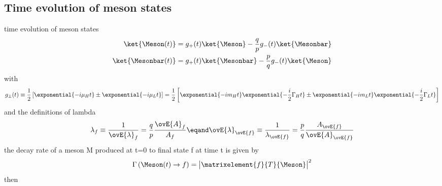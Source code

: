 \subsection{Time evolution of meson states}
\label{sec:cpv_theory:flavour_physics:time_evolution}

time evolution of meson states
%
\begin{equation}
  \begin{split}
    \ket{\Meson (t)}    &= g_{+}(t) \ket{\Meson}    - \frac{q}{p} g_{-}(t) \ket{\Mesonbar} \\
    \ket{\Mesonbar (t)} &= g_{+}(t) \ket{\Mesonbar} - \frac{p}{q} g_{-}(t) \ket{\Meson}
  \end{split}
\end{equation}
%
with 
%
\begin{equation}
  g_{\pm}(t) \equiv 
  \frac{1}{2} \left[
    \exponential{-i \mu_H t} \pm \exponential{-i \mu_L t}
  \right]
  =
  \frac{1}{2} \left[
    \exponential{-i m_H t} \exponential{-\frac{i}{2} \Gamma_H t} \pm \exponential{-i m_L t} \exponential{-\frac{i}{2} \Gamma_L t}
  \right]
\end{equation}
%
and the definitions of lambda
%
\begin{equation}
  \lambda_f               \equiv \frac{1}{\ovE{\lambda}_f}   = \frac{q}{p} \frac{\ovE{A}_f}{A_f} \eqand 
  \ovE{\lambda}_{\ovE{f}} \equiv \frac{1}{\lambda_{\ovE{f}}} = \frac{p}{q} \frac{A_{\ovE{f}}}{\ovE{A}_{\ovE{f}}}
\end{equation}
%
the decay rate of a meson M produced at t=0 to final state f at time t is given by
%
\begin{equation}
  \Gamma \left(\Meson(t)\to f\right)= \bigl\vert \matrixelement{f}{T}{\Meson} \bigr\vert^2
\end{equation}
%
then
%
